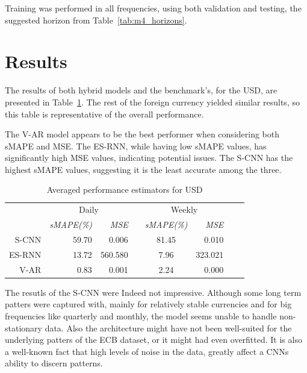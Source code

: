 \documentclass[conference]{IEEEtran}
\begin{document}
Training was performed in all frequencies, using both validation and testing, the suggested horizon from Table~\ref{tab:m4_horizons}.

\section{Results}

The results of both hybrid models and the benchmark's, for the USD, are presented in Table~\ref{tab:res}. The rest of the foreign currency yielded similar results, so this table is representative of the overall performance.

The V-AR model appears to be the best performer when considering both sMAPE and MSE. The ES-RNN, while having low sMAPE values, has significantly high MSE values, indicating potential issues. The S-CNN has the highest sMAPE values, suggesting it is the least accurate among the three.

\begin{table}\centering
{}
\caption{Averaged performance estimators for USD}\label{tab:res}
\begin{tabular}{@{}rrrrcrrr@{}}\toprule
& \multicolumn{2}{c}{Daily} & \phantom{abc}& \multicolumn{2}{c}{Weekly}\\
\cmidrule{2-3} \cmidrule{4-6}
& \textit{sMAPE(\%)} & \textit{MSE} && \textit{sMAPE(\%)} & \textit{MSE} \\
\midrule
S-CNN & 59.70  & 0.006 && 81.45 & 0.010 \\
ES-RNN & 13.72 & 560.580 && 7.96 & 323.021\\
V-AR & 0.83 & 0.001 && 2.24 & 0.000\\
\bottomrule
\end{tabular}
\end{table}

The resutls of the S-CNN were Indeed not impressive. Although some long term patters were captured with, mainly for relatively stable currencies and for big frequencies like quarterly and monthly, the model seems unable to handle non-stationary data. Also the architecture might have not been well-suited for the underlying patters of the ECB dataset, or it might had even overfitted. It is also a well-known fact that high levels of noise in the data, greatly affect a CNNs ability to discern patterns.
\end{document}

